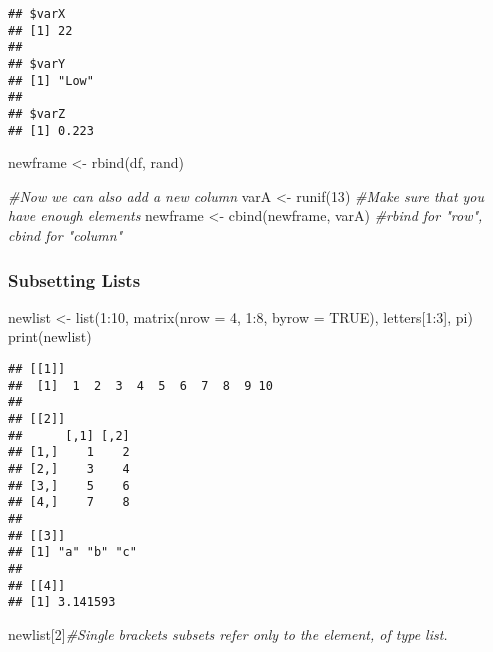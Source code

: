 \documentclass[
]{article}
\newenvironment{Shaded}{\begin{snugshade}}{\end{snugshade}}
\newcommand{\AttributeTok}[1]{\textcolor[rgb]{0.77,0.63,0.00}{#1}}
\newcommand{\CommentTok}[1]{\textcolor[rgb]{0.56,0.35,0.01}{\textit{#1}}}
\newcommand{\ConstantTok}[1]{\textcolor[rgb]{0.00,0.00,0.00}{#1}}
\newcommand{\DecValTok}[1]{\textcolor[rgb]{0.00,0.00,0.81}{#1}}
\newcommand{\FunctionTok}[1]{\textcolor[rgb]{0.00,0.00,0.00}{#1}}
\newcommand{\NormalTok}[1]{#1}
\newcommand{\OtherTok}[1]{\textcolor[rgb]{0.56,0.35,0.01}{#1}}
\newcommand{\SpecialCharTok}[1]{\textcolor[rgb]{0.00,0.00,0.00}{#1}}
\begin{document}
\begin{verbatim}
## $varX
## [1] 22
## 
## $varY
## [1] "Low"
## 
## $varZ
## [1] 0.223
\end{verbatim}

\begin{Shaded}
\begin{Highlighting}[]
\NormalTok{newframe }\OtherTok{\textless{}{-}} \FunctionTok{rbind}\NormalTok{(df, rand)}

\CommentTok{\#Now we can also add a new column}
\NormalTok{varA }\OtherTok{\textless{}{-}} \FunctionTok{runif}\NormalTok{(}\DecValTok{13}\NormalTok{) }\CommentTok{\#Make sure that you have enough elements}
\NormalTok{newframe }\OtherTok{\textless{}{-}} \FunctionTok{cbind}\NormalTok{(newframe, varA) }\CommentTok{\#rbind for "row", cbind for "column"}
\end{Highlighting}
\end{Shaded}

\hypertarget{subsetting-lists}{%
\subsubsection{Subsetting Lists}\label{subsetting-lists}}

\begin{Shaded}
\begin{Highlighting}[]
\NormalTok{newlist }\OtherTok{\textless{}{-}}
  \FunctionTok{list}\NormalTok{(}\DecValTok{1}\SpecialCharTok{:}\DecValTok{10}\NormalTok{, }\FunctionTok{matrix}\NormalTok{(}\AttributeTok{nrow =} \DecValTok{4}\NormalTok{, }\DecValTok{1}\SpecialCharTok{:}\DecValTok{8}\NormalTok{, }\AttributeTok{byrow =} \ConstantTok{TRUE}\NormalTok{), letters[}\DecValTok{1}\SpecialCharTok{:}\DecValTok{3}\NormalTok{], pi)}
\FunctionTok{print}\NormalTok{(newlist)}
\end{Highlighting}
\end{Shaded}

\begin{verbatim}
## [[1]]
##  [1]  1  2  3  4  5  6  7  8  9 10
## 
## [[2]]
##      [,1] [,2]
## [1,]    1    2
## [2,]    3    4
## [3,]    5    6
## [4,]    7    8
## 
## [[3]]
## [1] "a" "b" "c"
## 
## [[4]]
## [1] 3.141593
\end{verbatim}

\begin{Shaded}
\begin{Highlighting}[]
\NormalTok{newlist[}\DecValTok{2}\NormalTok{]}\CommentTok{\#Single brackets subsets refer only to the element, of type list.}
\end{Highlighting}
\end{Shaded}
\end{document}
